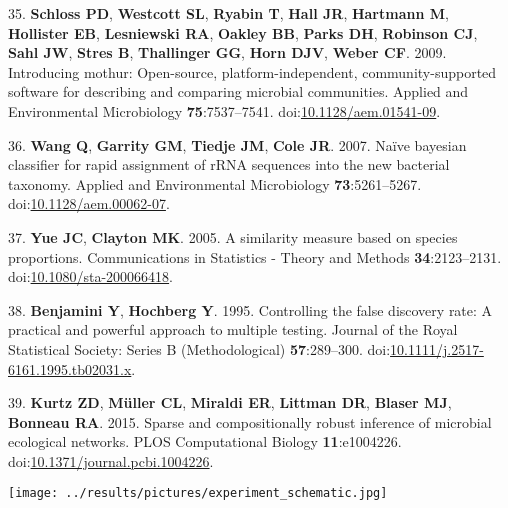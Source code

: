 \documentclass[
  12pt,
]{article}
\newenvironment{cslreferences}%
  {}%
  {\par}
\begin{document}
\begin{cslreferences}
\leavevmode\hypertarget{ref-Schloss2009}{}%
35. \textbf{Schloss PD}, \textbf{Westcott SL}, \textbf{Ryabin T},
\textbf{Hall JR}, \textbf{Hartmann M}, \textbf{Hollister EB},
\textbf{Lesniewski RA}, \textbf{Oakley BB}, \textbf{Parks DH},
\textbf{Robinson CJ}, \textbf{Sahl JW}, \textbf{Stres B},
\textbf{Thallinger GG}, \textbf{Horn DJV}, \textbf{Weber CF}. 2009.
Introducing mothur: Open-source, platform-independent,
community-supported software for describing and comparing microbial
communities. Applied and Environmental Microbiology
\textbf{75}:7537--7541.
doi:\href{https://doi.org/10.1128/aem.01541-09}{10.1128/aem.01541-09}.

\leavevmode\hypertarget{ref-Wang2007}{}%
36. \textbf{Wang Q}, \textbf{Garrity GM}, \textbf{Tiedje JM},
\textbf{Cole JR}. 2007. Naïve bayesian classifier for rapid assignment
of rRNA sequences into the new bacterial taxonomy. Applied and
Environmental Microbiology \textbf{73}:5261--5267.
doi:\href{https://doi.org/10.1128/aem.00062-07}{10.1128/aem.00062-07}.

\leavevmode\hypertarget{ref-Yue2005}{}%
37. \textbf{Yue JC}, \textbf{Clayton MK}. 2005. A similarity measure
based on species proportions. Communications in Statistics - Theory and
Methods \textbf{34}:2123--2131.
doi:\href{https://doi.org/10.1080/sta-200066418}{10.1080/sta-200066418}.

\leavevmode\hypertarget{ref-Benjamini1995}{}%
38. \textbf{Benjamini Y}, \textbf{Hochberg Y}. 1995. Controlling the
false discovery rate: A practical and powerful approach to multiple
testing. Journal of the Royal Statistical Society: Series B
(Methodological) \textbf{57}:289--300.
doi:\href{https://doi.org/10.1111/j.2517-6161.1995.tb02031.x}{10.1111/j.2517-6161.1995.tb02031.x}.

\leavevmode\hypertarget{ref-Kurtz2015}{}%
39. \textbf{Kurtz ZD}, \textbf{Müller CL}, \textbf{Miraldi ER},
\textbf{Littman DR}, \textbf{Blaser MJ}, \textbf{Bonneau RA}. 2015.
Sparse and compositionally robust inference of microbial ecological
networks. PLOS Computational Biology \textbf{11}:e1004226.
doi:\href{https://doi.org/10.1371/journal.pcbi.1004226}{10.1371/journal.pcbi.1004226}.
\end{cslreferences}

\newpage

\texttt{[image: ../results/pictures/experiment\_schematic.jpg]}
\end{document}
